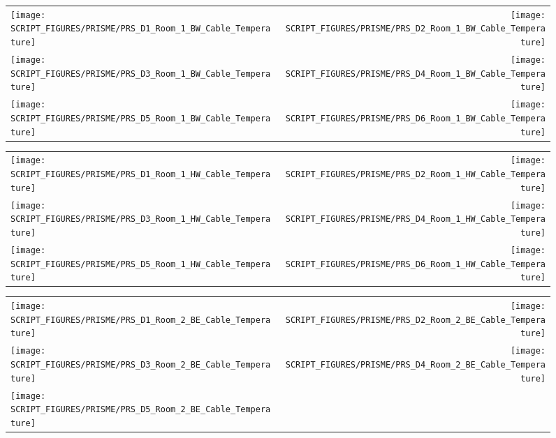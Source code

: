\begin{figure}[p]
\begin{tabular*}{\textwidth}{l@{\extracolsep{\fill}}r}
\texttt{[image: SCRIPT\_FIGURES/PRISME/PRS\_D1\_Room\_1\_BW\_Cable\_Temperature]} &
\texttt{[image: SCRIPT\_FIGURES/PRISME/PRS\_D2\_Room\_1\_BW\_Cable\_Temperature]} \\
\texttt{[image: SCRIPT\_FIGURES/PRISME/PRS\_D3\_Room\_1\_BW\_Cable\_Temperature]} &
\texttt{[image: SCRIPT\_FIGURES/PRISME/PRS\_D4\_Room\_1\_BW\_Cable\_Temperature]} \\
\texttt{[image: SCRIPT\_FIGURES/PRISME/PRS\_D5\_Room\_1\_BW\_Cable\_Temperature]} &
\texttt{[image: SCRIPT\_FIGURES/PRISME/PRS\_D6\_Room\_1\_BW\_Cable\_Temperature]}
\end{tabular*}
\label{PRISME_BW_Cable_Room_1}
\end{figure}

\begin{figure}[p]
\begin{tabular*}{\textwidth}{l@{\extracolsep{\fill}}r}
\texttt{[image: SCRIPT\_FIGURES/PRISME/PRS\_D1\_Room\_1\_HW\_Cable\_Temperature]} &
\texttt{[image: SCRIPT\_FIGURES/PRISME/PRS\_D2\_Room\_1\_HW\_Cable\_Temperature]} \\
\texttt{[image: SCRIPT\_FIGURES/PRISME/PRS\_D3\_Room\_1\_HW\_Cable\_Temperature]} &
\texttt{[image: SCRIPT\_FIGURES/PRISME/PRS\_D4\_Room\_1\_HW\_Cable\_Temperature]} \\
\texttt{[image: SCRIPT\_FIGURES/PRISME/PRS\_D5\_Room\_1\_HW\_Cable\_Temperature]} &
\texttt{[image: SCRIPT\_FIGURES/PRISME/PRS\_D6\_Room\_1\_HW\_Cable\_Temperature]}
\end{tabular*}
\label{PRISME_HW_Cable_Room_1}
\end{figure}

\begin{figure}[p]
\begin{tabular*}{\textwidth}{l@{\extracolsep{\fill}}r}
\texttt{[image: SCRIPT\_FIGURES/PRISME/PRS\_D1\_Room\_2\_BE\_Cable\_Temperature]} &
\texttt{[image: SCRIPT\_FIGURES/PRISME/PRS\_D2\_Room\_2\_BE\_Cable\_Temperature]} \\
\texttt{[image: SCRIPT\_FIGURES/PRISME/PRS\_D3\_Room\_2\_BE\_Cable\_Temperature]} &
\texttt{[image: SCRIPT\_FIGURES/PRISME/PRS\_D4\_Room\_2\_BE\_Cable\_Temperature]} \\
\texttt{[image: SCRIPT\_FIGURES/PRISME/PRS\_D5\_Room\_2\_BE\_Cable\_Temperature]} &

\end{tabular*}
\label{PRISME_BE_Cable_Room_2}
\end{figure}

